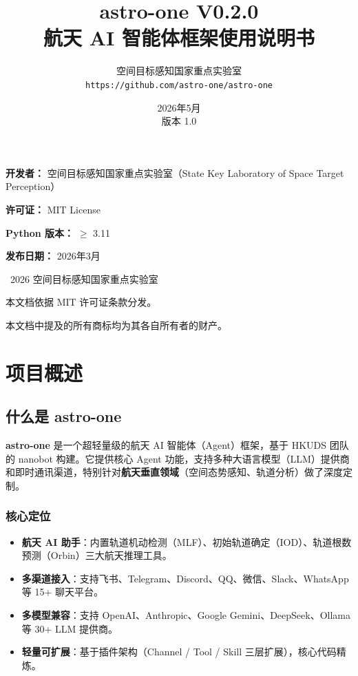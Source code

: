 \documentclass[12pt,a4paper,UTF8]{ctexart}
\title{{\Huge \textbf{astro-one V0.2.0}}\\[6pt]
       \Large 航天 AI 智能体框架使用说明书}
\author{空间目标感知国家重点实验室 \\
        \texttt{https://github.com/astro-one/astro-one}}
\date{2026年5月 \\ 版本 1.0}
\begin{document}
\maketitle
\thispagestyle{empty}

\vspace{3cm}
\begin{center}
    \large
    \textbf{开发者：} 空间目标感知国家重点实验室（State Key Laboratory of Space Target Perception）

    \textbf{许可证：} MIT License

    \textbf{Python 版本：} $\geq$ 3.11

    \textbf{发布日期：} 2026年3月
\end{center}

\newpage
\thispagestyle{empty}
\vspace*{\fill}
\begin{center}
    \textcopyright\ 2026 空间目标感知国家重点实验室

    本文档依据 MIT 许可证条款分发。

    本文档中提及的所有商标均为其各自所有者的财产。
\end{center}

\newpage
\tableofcontents
\newpage

\chapter{项目概述}

\section{什么是 astro-one}

\textbf{astro-one} 是一个超轻量级的航天 AI 智能体（Agent）框架，基于 HKUDS 团队的 nanobot 构建。它提供核心 Agent 功能，支持多种大语言模型（LLM）提供商和即时通讯渠道，特别针对\textbf{航天垂直领域}（空间态势感知、轨道分析）做了深度定制。

\subsection{核心定位}
\begin{itemize}
    \item \textbf{航天 AI 助手}：内置轨道机动检测（MLF）、初始轨道确定（IOD）、轨道根数预测（Orbin）三大航天推理工具。
    \item \textbf{多渠道接入}：支持飞书、Telegram、Discord、QQ、微信、Slack、WhatsApp 等 15+ 聊天平台。
    \item \textbf{多模型兼容}：支持 OpenAI、Anthropic、Google Gemini、DeepSeek、Ollama 等 30+ LLM 提供商。
    \item \textbf{轻量可扩展}：基于插件架构（Channel / Tool / Skill 三层扩展），核心代码精炼。
\end{itemize}
\end{document}
